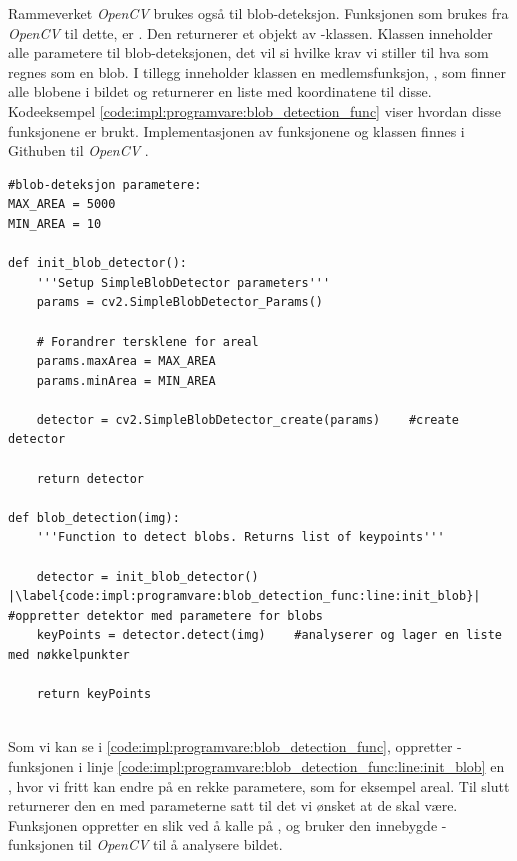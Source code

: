 Rammeverket \textit{OpenCV} brukes også til blob-deteksjon. 
Funksjonen som brukes fra \textit{OpenCV} til dette, er . 
Den returnerer et objekt av -klassen. 
Klassen inneholder alle parametere til blob-deteksjonen, det vil si hvilke krav vi stiller til hva som regnes som en blob. 
I tillegg inneholder klassen en medlemsfunksjon, , som finner alle blobene i bildet og returnerer en liste med koordinatene til disse. 
Kodeeksempel \ref{code:impl:programvare:blob_detection_func} viser hvordan disse funksjonene er brukt. Implementasjonen av funksjonene og klassen finnes i Githuben til \textit{OpenCV} \cite{OpencCV_Git}.
\begin{listing}[!htb]
\begin{verbatim}
#blob-deteksjon parametere:
MAX_AREA = 5000
MIN_AREA = 10

def init_blob_detector():
    '''Setup SimpleBlobDetector parameters'''
    params = cv2.SimpleBlobDetector_Params()

    # Forandrer tersklene for areal
    params.maxArea = MAX_AREA
    params.minArea = MIN_AREA

    detector = cv2.SimpleBlobDetector_create(params)    #create detector

    return detector
    
def blob_detection(img):
    '''Function to detect blobs. Returns list of keypoints'''

    detector = init_blob_detector() |\label{code:impl:programvare:blob_detection_func:line:init_blob}|    #oppretter detektor med parametere for blobs
    keyPoints = detector.detect(img)    #analyserer og lager en liste med nøkkelpunkter
    
    return keyPoints
    
\end{verbatim}
\caption{Implementasjon av blob-deteksjon. Merk at koden her er noe redigert for å være mer lesevennlig. Blant annet brukes flere ulike parametere. }
\label{code:impl:programvare:blob_detection_func}
\end{listing}

Som vi kan se i \autoref{code:impl:programvare:blob_detection_func}, oppretter -funksjonen i linje \ref{code:impl:programvare:blob_detection_func:line:init_blob} en , hvor vi fritt kan endre på en rekke parametere, som for eksempel areal. 
Til slutt returnerer den en  med parameterne satt til det vi ønsket at de skal være. 
Funksjonen  oppretter en slik ved å kalle på , og bruker den innebygde -funksjonen til \textit{OpenCV} til å analysere bildet. 

